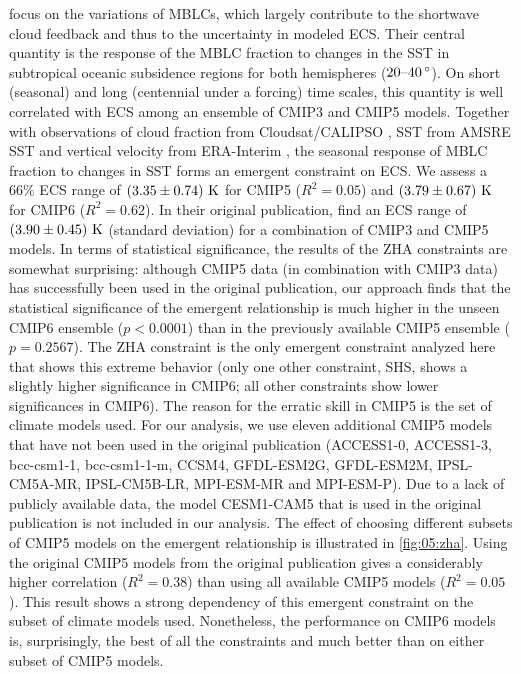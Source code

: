 \textcite{Zhai2015} focus on the variations of \acp{MBLC}, which largely
contribute to the shortwave cloud feedback and thus to the uncertainty in
modeled \ac{ECS}. Their central quantity is the response of the \ac{MBLC}
fraction to changes in the \ac{SST} in subtropical oceanic subsidence regions
for both hemispheres ($\rangeunit{20}{40}{\degree}$). On short (seasonal) and
long (centennial under a forcing) time scales, this quantity is well correlated
with \ac{ECS} among an ensemble of \acs{CMIP}3 and \acs{CMIP}5 models. Together
with observations of cloud fraction from Cloudsat/CALIPSO \autocite{Mace2009},
\ac{SST} from AMSRE \ac{SST} \autocite{AMSRE2011} and vertical velocity from
ERA-Interim \autocite{Dee2011}, the seasonal response of \ac{MBLC} fraction to
changes in \ac{SST} forms an emergent constraint on \ac{ECS}. We assess a $66
\unit{\%}$ \ac{ECS} range of $\pmrangeunit{3.35}{0.74}{K}$ for \acs{CMIP}5
($R^2 = 0.05$) and $\pmrangeunit{3.79}{0.67}{K}$ for \acs{CMIP}6 ($R^2 =
0.62$). In their original publication, \textcite{Zhai2015} find an \ac{ECS}
range of $\pmrangeunit{3.90}{0.45}{K}$ (standard deviation) for a combination
of \acs{CMIP}3 and \acs{CMIP}5 models. In terms of statistical significance,
the results of the ZHA constraints are somewhat surprising: although
\acs{CMIP}5 data (in combination with \acs{CMIP}3 data) has successfully been
used in the original publication, our approach finds that the statistical
significance of the emergent relationship is much higher in the unseen
\acs{CMIP}6 ensemble ($p < 0.0001$) than in the previously available
\acs{CMIP}5 ensemble ($p = 0.2567$). The ZHA constraint is the only emergent
constraint analyzed here that shows this extreme behavior (only one other
constraint, SHS, shows a slightly higher significance in \acs{CMIP}6; all other
constraints show lower significances in \acs{CMIP}6). The reason for the
erratic skill in \acs{CMIP}5 is the set of climate models used. For our
analysis, we use eleven additional \acs{CMIP}5 models that have not been used
in the original publication (ACCESS1-0, ACCESS1-3, bcc-csm1-1, bcc-csm1-1-m,
CCSM4, GFDL-ESM2G, GFDL-ESM2M, IPSL-CM5A-MR, IPSL-CM5B-LR, MPI-ESM-MR and
MPI-ESM-P). Due to a lack of publicly available data, the model CESM1-CAM5 that
is used in the original publication is not included in our analysis. The effect
of choosing different subsets of \acs{CMIP}5 models on the emergent
relationship is illustrated in \cref{fig:05:zha}. Using the original
\acs{CMIP}5 models from the original publication gives a considerably higher
correlation ($R^2 = 0.38$) than using all available \acs{CMIP}5 models ($R^2 =
0.05$). This result shows a strong dependency of this emergent constraint on
the subset of climate models used. Nonetheless, the performance on \acs{CMIP}6
models is, surprisingly, the best of all the constraints and much better than
on either subset of \acs{CMIP}5 models.


